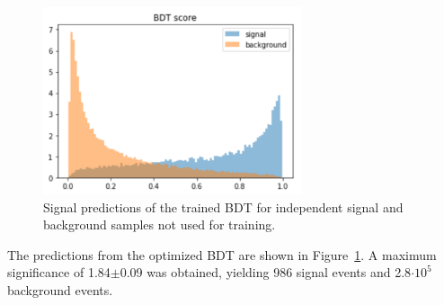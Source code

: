 \begin{figure}[!h]
\begin{center}
\includegraphics[width=3in]{BDT/bdt_pred}
\caption{Signal predictions of the trained BDT for independent signal and background samples not used for training.}
\label{fig:bdt_pred}
\end{center}
\end{figure}

The predictions from the optimized BDT are shown in Figure~\ref{fig:bdt_pred}. A maximum significance of 1.84$\pm$0.09 was obtained, yielding 986 signal events and 2.8$\cdot 10^5$ background events. 

